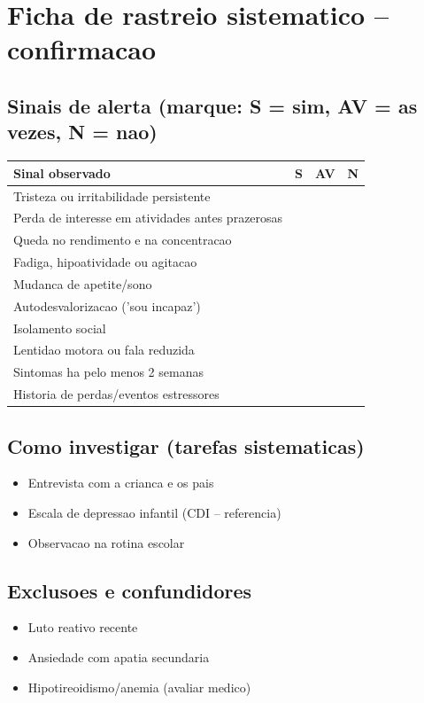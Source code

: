 \documentclass[a4paper,11pt]{book}
\begin{document}
\section*{Ficha de rastreio sistematico -- confirmacao}
\subsection*{Sinais de alerta (marque: S = sim, AV = as vezes, N = nao)}
\begin{tabular}{@{}p{11.5cm}ccc@{}}\toprule
Sinal observado & S & AV & N \\\midrule
Tristeza ou irritabilidade persistente & & & \\
Perda de interesse em atividades antes prazerosas & & & \\
Queda no rendimento e na concentracao & & & \\
Fadiga, hipoatividade ou agitacao & & & \\
Mudanca de apetite/sono & & & \\
Autodesvalorizacao ('sou incapaz') & & & \\
Isolamento social & & & \\
Lentidao motora ou fala reduzida & & & \\
Sintomas ha pelo menos 2 semanas & & & \\
Historia de perdas/eventos estressores & & & \\
\bottomrule\end{tabular}
\subsection*{Como investigar (tarefas sistematicas)}
\begin{itemize}
\item Entrevista com a crianca e os pais
\item Escala de depressao infantil (CDI -- referencia)
\item Observacao na rotina escolar
\end{itemize}
\subsection*{Exclusoes e confundidores}
\begin{itemize}
\item Luto reativo recente
\item Ansiedade com apatia secundaria
\item Hipotireoidismo/anemia (avaliar medico)
\end{itemize}
\end{document}
